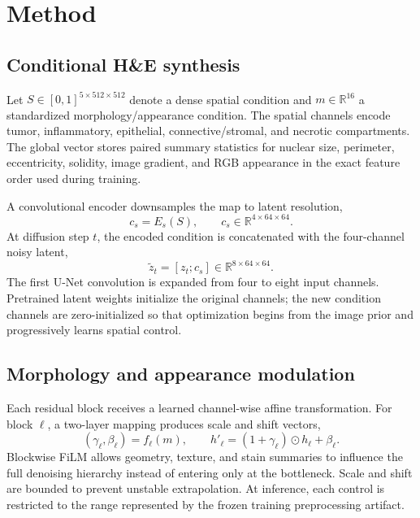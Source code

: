 \section{Method}
\label{sec:method}

\subsection{Conditional H\&E synthesis}

Let $S\in[0,1]^{5\times512\times512}$ denote a dense spatial condition and $m\in\mathbb{R}^{16}$ a standardized morphology/appearance condition. The spatial channels encode tumor, inflammatory, epithelial, connective/stromal, and necrotic compartments. The global vector stores paired summary statistics for nuclear size, perimeter, eccentricity, solidity, image gradient, and RGB appearance in the exact feature order used during training.

A convolutional encoder downsamples the map to latent resolution,
\begin{equation}
    c_s=E_s(S), \qquad c_s\in\mathbb{R}^{4\times64\times64}.
    \label{eq:spatial_encoder}
\end{equation}
At diffusion step $t$, the encoded condition is concatenated with the four-channel noisy latent,
\begin{equation}
    \widetilde z_t=[z_t;c_s]\in\mathbb{R}^{8\times64\times64}.
    \label{eq:latent_concat}
\end{equation}
The first U-Net convolution is expanded from four to eight input channels. Pretrained latent weights initialize the original channels; the new condition channels are zero-initialized so that optimization begins from the image prior and progressively learns spatial control.

\subsection{Morphology and appearance modulation}

Each residual block receives a learned channel-wise affine transformation. For block $\ell$, a two-layer mapping produces scale and shift vectors,
\begin{equation}
 (\gamma_\ell,\beta_\ell)=f_\ell(m),\qquad
 h'_\ell=(1+\gamma_\ell)\odot h_\ell+\beta_\ell.
 \label{eq:film}
\end{equation}
Blockwise FiLM allows geometry, texture, and stain summaries to influence the full denoising hierarchy instead of entering only at the bottleneck. Scale and shift are bounded to prevent unstable extrapolation. At inference, each control is restricted to the range represented by the frozen training preprocessing artifact.

